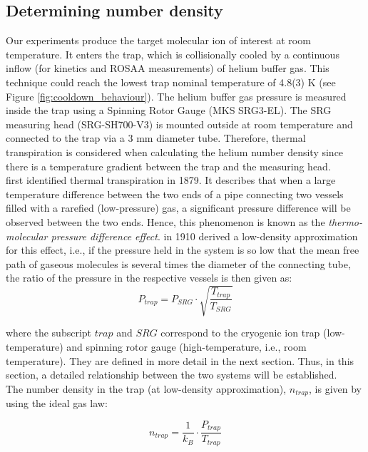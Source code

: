 \subsection{Determining number density}
\label{subsec:numer-density}

Our experiments produce the target molecular ion of interest at room
temperature. It enters the trap, which is collisionally cooled by a continuous
inflow (for kinetics and ROSAA measurements) of helium buffer gas. This
technique could reach the lowest trap nominal temperature of 4.8(3) K (see
Figure \ref{fig:cooldown_behaviour}). The helium buffer gas pressure is
measured inside the trap using a Spinning Rotor Gauge (MKS SRG3-EL). The SRG
measuring head (SRG-SH700-V3) is mounted outside at room temperature and
connected to the trap via a 3 mm diameter tube. Therefore, thermal
transpiration is considered when calculating the helium number density since
there is a temperature gradient between the trap and the measuring head.\\

\citet{reynolds_xviii_1879} first identified thermal transpiration in 1879. It describes that when a large temperature difference between the two ends of a pipe connecting two vessels filled with a rarefied (low-pressure) gas, a significant pressure difference will be observed between the two ends. Hence, this phenomenon is known as the \textit{thermo-molecular pressure difference effect}. \citet{knudsen_thermischer_1910} in 1910 derived a low-density approximation for this effect, i.e., if the pressure held in the system is so low that the mean free path of gaseous molecules is several times the diameter of the connecting tube, the ratio of the pressure in the respective vessels is then given as:
\begin{equation}
    P_{trap} = P_{SRG} \cdot \sqrt{\frac{T_{trap}}{T_{SRG}}}
    \label{eqn:knudsen}
\end{equation}

where the subscript $trap$ and $SRG$ correspond to the cryogenic ion trap
(low-temperature) and spinning rotor gauge (high-temperature, i.e., room
temperature). They are defined in more detail in the next section. Thus, in
this section, a detailed relationship between the two systems will be
established.\\

The number density in the trap (at low-density approximation), $n_{trap}$, is
given by using the ideal gas law:

\begin{equation}
    n_{trap} = \frac{1}{k_B} \cdot \frac{P_{trap}}{T_{trap}}
    \label{eqn:ideal-gas-law}
\end{equation}

